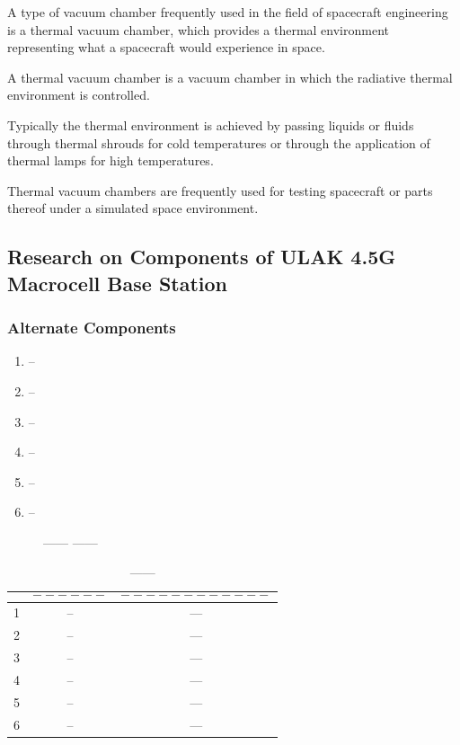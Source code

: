 A type of vacuum chamber frequently used in the field of spacecraft engineering is a thermal vacuum chamber, which provides a thermal environment representing what a spacecraft would experience in space.

	A thermal vacuum chamber is a vacuum chamber in which the radiative thermal environment is controlled.

Typically the thermal environment is achieved by passing liquids or fluids through thermal shrouds for cold temperatures or through the application of thermal lamps for high temperatures.

Thermal vacuum chambers are frequently used for testing spacecraft or parts thereof under a simulated space environment.

\subsection{Research on Components of ULAK 4.5G Macrocell Base Station  }

\subsubsection{Alternate Components}


\begin{enumerate}
\item --
\item --
\item --
\item --
\item --
\item --
\end{enumerate}

\begin{figure}[H]
\centering
\caption{\label{fig:------} ------ ------  }
\end{figure}
								
	
\begin{table}[H]
  \centering
 
    \begin{tabular}{c|c|c}
       &$$------$$ & $$------------$$ \\ \hline
       1 & -- & ---  \\ \hline
       2 & -- & ---  \\ \hline
       3 & -- & ---  \\ \hline
       4 & -- & ---  \\ \hline
       5 & -- & ---  \\ \hline
       6 & -- & --- 
      
  \end{tabular}
  \caption{------}
  \label{tab:------}
\end{table}
	
